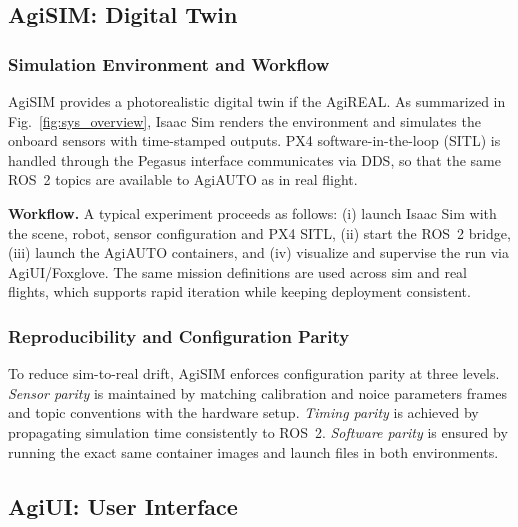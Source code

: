 \documentclass[letterpaper, 10 pt, conference]{ieeeconf}  %
\newcommand{\Agisim}{AgiSIM}
\newcommand{\Agiui}{AgiUI}
\newcommand{\Agihw}{AgiREAL}
\newcommand{\Agiautonomys}{AgiAUTO }
\newcommand{\Agisims}{AgiSIM }
\begin{document}
\subsection{\Agisim: Digital Twin} \label{sec:platform.sim}

\subsubsection{Simulation Environment and Workflow}
\Agisims provides a photorealistic digital twin if the \Agihw. As summarized in Fig.~\ref{fig:sys_overview}, Isaac Sim renders the environment and simulates the onboard sensors with time-stamped outputs. PX4 software-in-the-loop (SITL) is handled through the Pegasus interface \cite{jacinto2024pegasus} communicates via DDS, so that the same ROS~2 topics are available to \Agiautonomys as in real flight.

\noindent\textbf{Workflow.} A typical experiment proceeds as follows: (i) launch Isaac Sim with the scene, robot, sensor configuration and PX4 SITL, (ii) start the ROS~2 bridge, (iii) launch the \Agiautonomys containers, and (iv) visualize and supervise the run via \Agiui/Foxglove. The same mission definitions are used across sim and real flights, which supports rapid iteration while keeping deployment consistent.

\subsubsection{Reproducibility and Configuration Parity}
To reduce sim-to-real drift, \Agisims enforces configuration parity at three levels. 
\emph{Sensor parity} is maintained by matching calibration and noice parameters frames and topic conventions with the hardware setup. 
\emph{Timing parity} is achieved by propagating simulation time consistently to ROS~2. 
\emph{Software parity} is ensured by running the exact same container images and launch files in both environments.


\subsection{AgiUI: User Interface}\label{sec:platform.ui}
\end{document}
